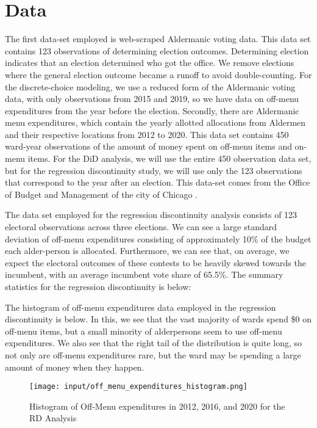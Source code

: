 \section*{Data}
The first data-set employed is web-scraped Aldermanic voting data. This data set contains 123 observations of determining election outcomes. 
Determining election indicates that an election determined who got the office. 
We remove elections where the general election outcome became a runoff to avoid double-counting. 
For the discrete-choice modeling, we use a reduced form of the Aldermanic voting data, with only observations from 2015 and 2019, so we have data on off-menu expenditures from the year before the election. 
Secondly, there are Aldermanic menu expenditures, which contain the yearly allotted allocations from Aldermen and their respective locations from 2012 to 2020. 
This data set contains 450 ward-year observations of the amount of money spent on off-menu items and on-menu items. 
For the DiD analysis, we will use the entire 450 observation data set, but for the regression discontinuity study, we will use only the 123 observations that correspond to the year after an election. 
This data-set comes from the Office of Budget and Management of the city of Chicago \cite{MenuProgramChoices}. 

The data set employed for the regression discontinuity analysis consists of 123 electoral observations across three elections. 
We can see a large standard deviation of off-menu expenditures consisting of approximately 10\% of the budget each alder-person is allocated. 
Furthermore, we can see that, on average, we expect the electoral outcomes of these contests to be heavily skewed towards the incumbent, with an average incumbent vote share of 65.5\%. The summary statistics for the regression discontinuity is below:



The histogram of off-menu expenditures data employed in the regression discontinuity is below. 
In this, we see that the vast majority of wards spend \$0 on off-menu items, but a small minority of alderpersons seem to use off-menu expenditures. 
We also see that the right tail of the distribution is quite long, so not only are off-menu expenditures rare, but the ward may be spending a large amount of money when they happen.

\begin{figure}[H]
    \centering
    \texttt{[image: input/off\_menu\_expenditures\_histogram.png]}
    \caption{Histogram of Off-Menu expenditures in 2012, 2016, and 2020 for the RD Analysis}
    \label{fig:my_label}
\end{figure}

